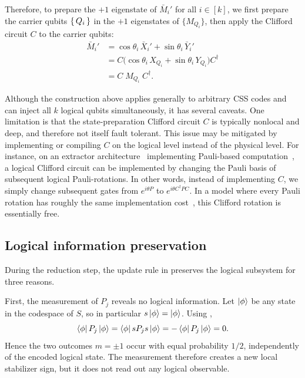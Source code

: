 Therefore, to prepare the $+1$ eigenstate of $ \bar{M}_i' $ for all $ i \in [k] $, we first prepare the carrier qubits $\set{Q_i}$ in the $+1$ eigenstates of $ \{M_{Q_i}\} $, then apply the Clifford circuit $C$ to the carrier qubits:
\begin{equation}
\begin{aligned}
    \bar{M}_i' &= \cos\theta_i\, \bar{X}_i' + \sin\theta_i\, \bar{Y}_i' \\
    &= C \bigl(\cos\theta_i\, X_{Q_i} + \sin\theta_i\, Y_{Q_i}\bigr) C^\dagger \\
    &= C \;{M}_{Q_i}\; C^\dagger .
\end{aligned}
\end{equation}

Although the construction above applies generally to arbitrary CSS codes and can inject all \(k\) logical qubits simultaneously, it has several caveats.
One limitation is that the state-preparation Clifford circuit \(C\) is typically nonlocal and deep, and therefore not itself fault tolerant. 
This issue may be mitigated by implementing or compiling \(C\) on the logical level instead of the physical level. 
For instance, on an extractor architecture~\cite{he_extractors_2025} implementing Pauli-based computation~\cite{Bravyi2016}, a logical Clifford circuit can be implemented by changing the Pauli basis of subsequent logical Pauli-rotations. 
In other words, instead of implementing \(C\), we simply change subsequent gates from \(e^{i\theta P}\) to \(e^{i\theta C^\dagger PC}\). 
In a model where every Pauli rotation has roughly the same implementation cost~\cite{he_extractors_2025}, this Clifford rotation is essentially free.

\subsection{Logical information preservation}

During the reduction step, the update rule in
preserves the logical subsystem for three reasons.

First, the measurement of $P_j$ reveals no logical information. Let
$\ket{\phi}$ be any state in the codespace of $S$, so in particular
$s \ket{\phi} = \ket{\phi}$. Using ,
\begin{equation}
\bra{\phi} P_j \ket{\phi}
=
\bra{\phi} s P_j s \ket{\phi}
=
- \bra{\phi} P_j \ket{\phi}
= 0 .
\label{eq:tomas-step-random-outcome}
\end{equation}
Hence the two outcomes $m = \pm 1$ occur with equal probability $1/2$,
independently of the encoded logical state. The measurement therefore creates a
new local stabilizer sign, but it does not read out any logical observable.


